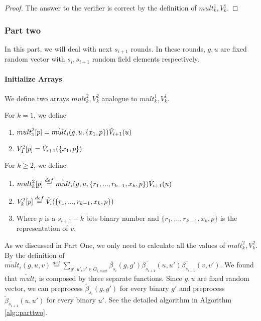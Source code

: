{{{\begin{proof}
		The answer to the verifier is correct by the definition of ${mult}_k^1, {V}_k^1$.
	\end{proof}
	
	\subsubsection{Part two}
	In this part, we will deal with next $s_{i+1}$ rounds. In these rounds, $g, u$ are fixed random vector with $s_{i}, s_{i+1}$ random field elements respectively.
	
	\paragraph*{Initialize Arrays}
	We define two arrays ${mult}_k^2, {V}_k^2$ analogue to ${mult}_k^1, {V}_k^1$.
	
	\begin{definition}
		For $k=1$, we define 
		\begin{enumerate}
			\item ${mult}_1^2[p] = \tilde{mult}_i(g, u, \{x_1, p\})\tilde{V}_{i+1}(u)$
			\item ${V}_1^2[p] = \tilde{V}_{i+1}(\{x_1, p\})$
		\end{enumerate}
		For $k\ge 2$, we define
		\begin{enumerate}
			\item ${mult}_k^2[p]\overset{def}{=}\tilde{mult}_i(g, u, \{r_1, ..., r_{k-1}, x_k, p\})\tilde{V}_{i+1}(u)$
			\item ${V}_k^2[p]\overset{def}{=}\tilde{V}_i(\{r_1, ..., r_{k-1}, x_k, p\})$
			\item Where $p$ is a $s_{i+1}-k$ bits binary number and $\{r_1, ..., r_{k-1}, x_k, p\}$ is the representation of $v$.
		\end{enumerate}
	\end{definition}
	
	As we discussed in Part One, we only need to calculate all the values of ${mult}_k^2, {V}_k^2$. By the definition of $\tilde{mult}_i(g, u, v)\overset{def}{=}\sum_{g', u', v' \in G_{i, mult}}\tilde{\beta_{s_i}}(g, g')\tilde{\beta_{s_{i+1}}}(u, u')\tilde{\beta_{s_{i+1}}}(v, v')$. We found that $\tilde{mult}_i$ is composed by three separate functions. Since $g, u$ are fixed random vector, we can preprocess $\tilde{\beta}_{s_i}(g, g')$ for every binary $g'$ and preprocess $\tilde{\beta}_{s_{i+1}}(u, u')$ for every binary $u'$. See the detailed algorithm in Algorithm \ref{alg::parttwo}.
	
}}}

